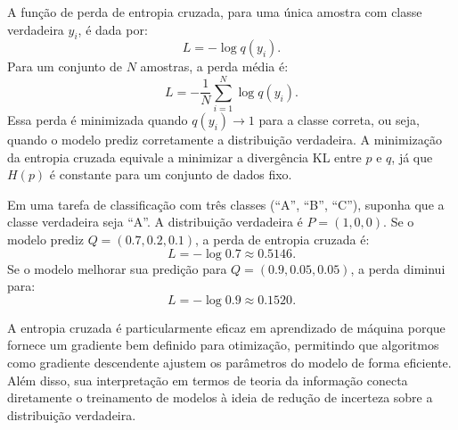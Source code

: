 A função de perda de entropia cruzada, para uma única amostra com classe verdadeira $y_i$, é dada por:
\begin{equation}
L = - \log q(y_i).
\end{equation}
Para um conjunto de $N$ amostras, a perda média é:
\begin{equation}
L = - \frac{1}{N} \sum_{i=1}^N \log q(y_i).
\end{equation}
Essa perda é minimizada quando $q(y_i) \to 1$ para a classe correta, ou seja,
quando o modelo prediz corretamente a distribuição verdadeira. A minimização da
entropia cruzada equivale a minimizar a divergência KL entre $p$ e $q$, já que
$H(p)$ é constante para um conjunto de dados fixo.

\begin{example}
Em uma tarefa de classificação com três classes (``A'', ``B'', ``C''), 
suponha que a classe verdadeira seja ``A''. 
A distribuição verdadeira é $P = (1, 0, 0)$. 
Se o modelo prediz $Q = (0.7, 0.2, 0.1)$, a perda de entropia cruzada é:
\[
L = - \log 0.7 \approx 0.5146.
\]
Se o modelo melhorar sua predição para $Q = (0.9, 0.05, 0.05)$, a perda diminui para:
\[
L = - \log 0.9 \approx 0.1520.
\]
\end{example}

A entropia cruzada é particularmente eficaz em aprendizado de máquina porque
fornece um gradiente bem definido para otimização, permitindo que algoritmos
como gradiente descendente ajustem os parâmetros do modelo de forma eficiente.
Além disso, sua interpretação em termos de teoria da informação conecta
diretamente o treinamento de modelos à ideia de redução de incerteza sobre a
distribuição verdadeira.


